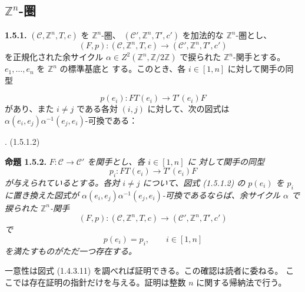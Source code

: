 \clearpage
{}%
\subsection{\texorpdfstring{$\mathbb Z^n$}{Z n}-圏}

\noindent\textbf{1.5.1.}\quad
$(\mathcal C,\mathbb Z^n,T,c)$ を $\mathbb Z^n$-圏、
$(\mathcal C',\mathbb Z^n,T',c')$ を加法的な $\mathbb Z^n$-圏とし、
\[
  (F,p)\colon(\mathcal C,\mathbb Z^n,T,c)
  \longrightarrow(\mathcal C',\mathbb Z^n,T',c')
\]
を正規化された余サイクル
$\alpha\in Z^2(\mathbb Z^n,\mathbb Z/2\mathbb Z)$ で捩られた
$\mathbb Z^n$-関手とする。$e_1,\ldots,e_n$ を $\mathbb Z^n$ の標準基底と
する。このとき、各 $i\in[1,n]$ に対して関手の同型

\begin{equation}
  p(e_i)\colon FT(e_i)\longrightarrow T'(e_i)F
  \tag{1.5.1.1}
\end{equation}
があり、また $i\ne j$ である各対 $(i,j)$ に対して、次の図式は
$\alpha(e_i,e_j)\alpha^{-1}(e_j,e_i)$-可換である：

\begin{center}
  \;.
  \hfill\textup{(1.5.1.2)}
\end{center}

\noindent\textbf{命題 1.5.2.}\quad
\emph{$F\colon\mathcal C\to\mathcal C'$ を関手とし、各 $i\in[1,n]$ に
対して関手の同型
\[
  p_i\colon FT(e_i)\longrightarrow T'(e_i)F
\]
が与えられているとする。各対 $i\ne j$ について、図式 (1.5.1.2) の
$p(e_i)$ を $p_i$ に置き換えた図式が
$\alpha(e_i,e_j)\alpha^{-1}(e_j,e_i)$-可換であるならば、余サイクル
$\alpha$ で捩られた $\mathbb Z^n$-関手
\[
  (F,p)\colon(\mathcal C,\mathbb Z^n,T,c)
  \longrightarrow(\mathcal C',\mathbb Z^n,T',c')
\]
で
\[
  p(e_i)=p_i,
  \qquad i\in[1,n]
\]
を満たすものがただ一つ存在する。}

一意性は図式 (1.4.3.11) を調べれば証明できる。この確認は読者に委ねる。
ここでは存在証明の指針だけを与える。証明は整数 $n$ に関する帰納法で行う。
